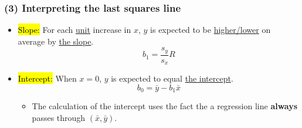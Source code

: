 \documentclass[slidestop,compress,mathserif,12pt,t,professionalfonts,xcolor=table]{beamer}
\begin{document}
\begin{frame}
\frametitle{(3) Interpreting the last squares line}

\begin{itemize}

\item \hl{Slope:} For each \underline{unit} increase in \underline{$x$}, \underline{$y$} is expected to be \underline{higher/lower} on average by \underline{the slope}.
\[ b_1 = \frac{s_y}{s_x} R \]

\item \hl{Intercept:} When \underline{$x = 0$}, \underline{$y$} is expected to equal \underline{the intercept}.
\[ b_0 = \bar{y} - b_1 \bar{x} \]
\begin{itemize}
\item The calculation of the intercept uses the fact the a regression line \textbf{always} passes through $(\bar{x},\bar{y})$.
\end{itemize}

\end{itemize}






\end{frame}

\end{document}
